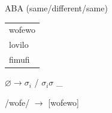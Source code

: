 \documentclass{beamer}
\begin{document}


  

\begin{frame}{ABA (same/different/same)}
\centering\Huge  \begin{tabular}{l}
    wofewo\\
    lovilo\\
    fimufi
  \end{tabular}

  \pause

\vspace{1cm}  $\varnothing\to\sigma_i$ / $\sigma_i\sigma$ \_
  


  \vspace{1cm}

  /wofe/ $\to$ [wofewo]

\end{frame}










  
\end{document}

